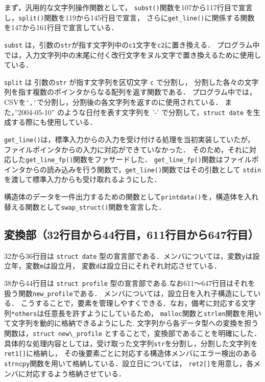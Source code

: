 \documentclass[a4j,11pt]{jarticle}
\begin{document}
まず，汎用的な文字列操作関数として，
\verb|subst()|関数を107から117行目で宣言し，\verb|split()|関数を119から145行目で宣言，
さらに\verb|get_line()|に関係する関数を147から161行目で宣言している．

\verb|subst| は，引数の\verb|str|が指す文字列中の\verb|c1|文字を\verb|c2|に置き換える．
プログラム中では，入力文字列中の末尾に付く改行文字をヌル文字で置き換えるために使用している．

\verb|split| は 引数の\verb|str| が指す文字列を区切文字 \verb|c| で分割し，
分割した各々の文字列を指す複数のポインタからなる配列を返す関数である．
プログラム中では，CSVを\verb|','|で分割し，分割後の各文字列を返すのに使用されている．
また，''2004-05-10'' のような日付を表す文字列を '-' で分割して，\verb|struct date| を生成する際にも使用している．

\verb|get_line()|は，標準入力からの入力を受け付ける処理を当初実装していたが，ファイルポインタからの入力に対応ができていなかった．
そのため，それに対応した\verb|get_line_fp()|関数をファサードした．
\verb|get_line_fp()|関数はファイルポインタからの読み込みを行う関数で，\verb|get_line()|関数ではその引数として
\verb|stdin|を渡して標準入力からも受け取れるようにした．

構造体のデータを一件出力するための関数として\verb|printdata()|を，構造体を入れ替える関数として\verb|swap_struct()|関数を宣言した．
\subsection{変換部（32行目から44行目，611行目から647行目）}

32から36行目は \verb|struct date| 型の宣言部である．メンバについては，変数\verb|y|は設立年，変数\verb|m|は設立月，
変数\verb|d|は設立日にそれぞれ対応させている．

38から44行目は \verb|struct profile| 型の宣言部である.なお611〜647行目はそれを扱う関数\verb|new_profile|である．
メンバについては，設立日を入れ子構造にしている．
こうすることで，要素を管理しやすくできる．なお，備考に対応する文字列\verb|*others|は任意長を許すようにしているため，
\verb|malloc|関数と\verb|strlen|関数を用いて文字列を動的に格納できるようにした. 
文字列から各データ型への変換を担う関数は，\verb|struct new\_profile| とすることで，変換部であることを明確にした．
具体的な処理内容としては，受け取った文字列\verb|str|を分割し，分割した文字列を\verb|ret1[]|に格納し，
その後要素ごとに対応する構造体メンバにエラー検出のある\verb|strncpy|関数を用いて格納している．設立日については，
\verb|ret2[]|を用意し，各メンバに対応するよう格納させている．
\end{document}
